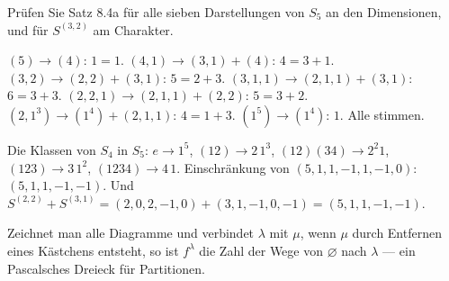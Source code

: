\begin{aufgabe}
Prüfen Sie Satz 8.4a für alle sieben Darstellungen von $S_5$ an den Dimensionen, und für $S^{(3,2)}$ am Charakter.

\loesung
{}
$(5)\to(4)$: $1 = 1$. $(4, 1)\to(3, 1) + (4)$: $4 = 3 + 1$. $(3, 2)\to(2, 2) + (3, 1)$: $5 = 2 + 3$. $(3, 1, 1)\to(2, 1, 1) + (3, 1)$: $6 = 3 + 3$. $(2, 2, 1)\to(2, 1, 1) + (2, 2)$: $5 = 3 + 2$. $(2, 1^{3})\to(1^{4}) + (2, 1, 1)$: $4 = 1 + 3$. $(1^{5})\to(1^{4})$: $1$. Alle stimmen. \checkmark

Die Klassen von $S_4$ in $S_5$: $e\to1^{5}$, $(12)\to2\,1^{3}$, $(12)(34)\to2^{2}1$, $(123)\to3\,1^{2}$, $(1234)\to4\,1$. Einschränkung von $(5, 1, 1, -1, 1, -1, 0)$: $(5, 1, 1, -1, -1)$. Und $S^{(2,2)} + S^{(3,1)} = (2, 0, 2, -1, 0) + (3, 1, -1, 0, -1) = (5, 1, 1, -1, -1)$. \checkmark

Zeichnet man alle Diagramme und verbindet $\lambda$ mit $\mu$, wenn $\mu$ durch Entfernen eines Kästchens entsteht, so ist $f^{\lambda}$ die Zahl der Wege von $\varnothing$ nach $\lambda$ --- ein Pascalsches Dreieck für Partitionen.

\begin{center}
\begin{minipage}{0.88\textwidth}
\end{minipage}
\end{center}
\end{aufgabe}

